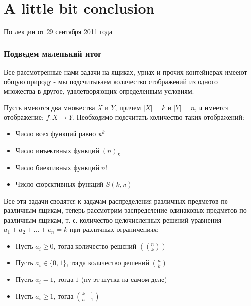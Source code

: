 \chapter{A little bit conclusion}

По лекции от 29 сентября 2011 года

\subsection{Подведем маленький итог}

Все рассмотренные нами задачи на ящиках, урнах и прочих контейнерах имееют общую природу - мы подсчитываем количество отображений из одного множества в другое, удолетворяющих определенным условиям.

Пусть имеются два множества $X$ и $Y$, причем $\left|X\right| = k$ и $\left|Y\right|=n$, и имеется отображение: $f : X \rightarrow Y$. Необходимо подсчитать количество таких отображений:

\begin{itemize}
\item Число всех функций равно $n^k$

\item Число инъектвных функций $\left(n\right)_k$

\item Число биективных функций $n!$

\item Число сюрективных функций $\hat S \left(k,n\right)$
\end{itemize}

Все эти задачи сводятся к задачам распределения различных предметов по различным ящикам, теперь рассмотрим распределение одинаковых предметов по различным ящикам, т. е. количество целочисленных решений уравнения $a_1 + a_2 + ... + a_n = k$ при различных ограничениях:

\begin{itemize}
\item Пусть $a_i \ge 0$, тогда количество решений $\left(\binom{n}{k}\right)$

\item Пусть $a_i \in \{0,1\}$, тогда количество решений $\binom{n}{k}$

\item Пусть $a_i = 1$, тогда $1$ (ну эт шутка на самом деле)

\item Пусть $a_i \ge 1$, тогда $\binom{k-1}{n-1}$
\end{itemize}

